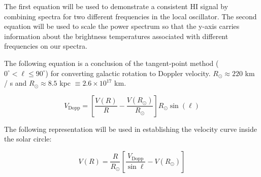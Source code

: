 \documentclass[12pt]{article}
\begin{document}
The first equation will be used to demonstrate a consistent HI signal by combining spectra for two different frequencies in the local oscillator. The second equation will be used to scale the power spectrum so that the y-axis carries information about the brightness temperatures associated with different frequencies on our spectra.

The following equation is a conclusion of the tangent-point method ($0^\circ < \ell \leq 90^\circ$) for converting galactic rotation to Doppler velocity. $R_\odot \approx 220 $ km / s and $R_\odot \approx 8.5$ kpc $\equiv 2.6 \times 10^{17}$ km. 

\begin{equation} \label{eq:vel_dopp}
V_\text{Dopp} = \left[ \frac{V(R)}{R} - \frac{V(R_\odot)}{R_\odot} \right] R_\odot \sin(\ell)
\end{equation}



The following representation will be used in establishing the velocity curve inside the solar circle:

\begin{equation} \label{eq:vel_curve}
V(R) = \frac{R}{R_\odot} \left[ \frac{V_\text{Dopp}}{\sin \ell} - V(R_\odot) \right] 
\end{equation}




\end{document}
